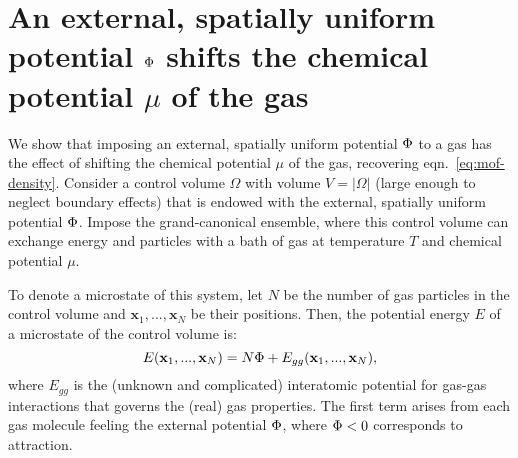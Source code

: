 \appendix
\clearpage
\setcounter{table}{0}
\renewcommand{\thetable}{S\arabic{table}}%
\setcounter{figure}{0}
\renewcommand{\thefigure}{S\arabic{figure}}%
\renewcommand{\thesection}{SI \Alph{section}}%

\section{An external, spatially uniform potential $\Phi$ shifts the chemical potential $\mu$ of the gas} \label{sec:V_shifts_chem_pot}
We show that imposing an external, spatially uniform potential $\Phi$ to a gas has the effect of shifting the chemical potential $\mu$ of the gas, recovering eqn.~\ref{eq:mof-density}. Consider a control volume $\Omega$ with volume $V=|\Omega|$ (large enough to neglect boundary effects) that is endowed with the external, spatially uniform potential $\Phi$. Impose the grand-canonical ensemble, where this control volume can exchange energy and particles with a bath of gas at temperature $T$ and chemical potential $\mu$.

To denote a microstate of this system, let $N$ be the number of gas particles in the control volume and $\mathbf{x}_1,...,\mathbf{x}_N$ be their positions. Then, the potential energy $E$ of a microstate of the control volume is:
\begin{equation}
    E(\mathbf{x}_1,...,\mathbf{x}_N) = N\Phi + E_{gg}(\mathbf{x}_1,...,\mathbf{x}_N),
\end{equation} where $E_{gg}$ is the (unknown and complicated) interatomic potential for gas-gas interactions that governs the (real) gas properties. The first term arises from each gas molecule feeling the external potential $\Phi$, where $\Phi < 0$ corresponds to attraction.


